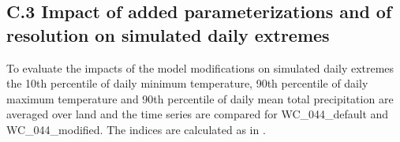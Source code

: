 \documentclass[a0b,landscape]{a0poster}
\begin{document}
\begin{multicols*}{4}
\subsection*{C.3 Impact of added parameterizations and of resolution on simulated daily extremes}

To evaluate the impacts of the model modifications on simulated daily extremes the 10th percentile of
daily minimum temperature, 90th percentile of daily maximum temperature and 90th percentile of
daily mean total precipitation are averaged over land and the time series are compared for WC\_044\_default and
WC\_044\_modified. The indices are calculated as in \citet{curry2016}.

\noindent
\begin{minipage}[t]{\linewidth}
\center
{}
\end{minipage}



\end{multicols*}
\end{document}
